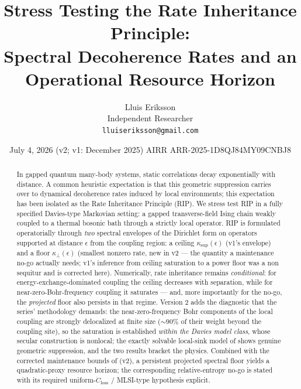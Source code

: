 \documentclass[11pt,a4paper]{article}
\title{Stress Testing the Rate Inheritance Principle:\\
Spectral Decoherence Rates and an Operational Resource Horizon}
\author{Lluis Eriksson\\ \small Independent Researcher\\
\small \texttt{lluiseriksson@gmail.com}}
\date{July 4, 2026 \quad (v2; v1: December 2025) \quad AIRR ARR-2025-1D8QJ84MY09CNBJ8}
\theoremstyle{plain}
\theoremstyle{definition}
\theoremstyle{remark}
\newcommand{\eps}{\epsilon}
\newcommand{\ksup}{\kappa_{\sup}}
\newcommand{\kfl}{\kappa_{\perp}}
\begin{document}
\maketitle

\begin{center}
\end{center}

\begin{abstract}
In gapped quantum many-body systems, static correlations decay exponentially
with distance. A common heuristic expectation is that this geometric
suppression carries over to dynamical decoherence rates induced by local
environments; this expectation has been isolated as the Rate Inheritance
Principle (RIP). We stress test RIP in a fully specified Davies-type Markovian
setting: a gapped transverse-field Ising chain weakly coupled to a thermal
bosonic bath through a strictly local operator. RIP is formulated
operatorially through \emph{two} spectral envelopes of the Dirichlet form on
operators supported at distance $\eps$ from the coupling region: a ceiling
$\ksup(\eps)$ (v1's envelope) and a floor $\kfl(\eps)$ (smallest nonzero rate,
new in v2 --- the quantity a maintenance no-go actually needs; v1's inference
from ceiling saturation to a power floor was a non sequitur and is corrected
here). Numerically, rate inheritance remains \emph{conditional}: for
energy-exchange-dominated coupling the ceiling decreases with separation,
while for near-zero-Bohr-frequency coupling it saturates --- and, more
importantly for the no-go, the \emph{projected} floor also persists in that
regime.
Version 2 adds the diagnostic that the series' methodology demands: the
near-zero-frequency Bohr components of the local coupling are strongly
delocalized at finite size ($\sim 90\%$ of their weight beyond the coupling
site), so the saturation is established \emph{within the Davies model class},
whose secular construction is nonlocal; the exactly solvable local-sink model
of \cite{HCut} shows genuine geometric suppression, and the two results
bracket the physics. Combined with the corrected maintenance bounds of
\cite{MaintWork} (v2), a persistent projected spectral floor yields a
quadratic-proxy resource horizon; the corresponding relative-entropy no-go is
stated with its required uniform-$\dot{C}_{\mathrm{loss}}$ / MLSI-type
hypothesis explicit.
\end{abstract}
\end{document}
